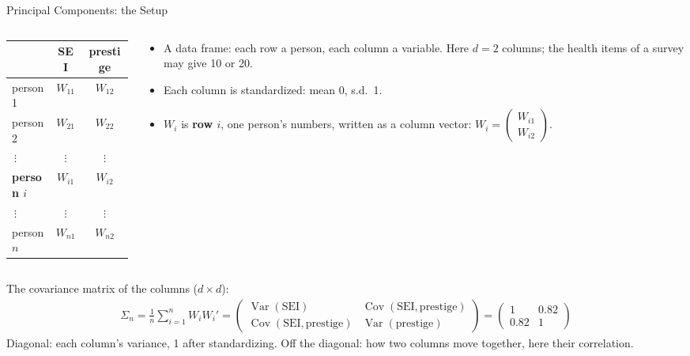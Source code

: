 \documentclass[aspectratio=169,11pt,xcolor=dvipsnames]{beamer}
\DeclareMathOperator{\Cov}{Cov}
\DeclareMathOperator{\Var}{Var}
\begin{document}
\begin{frame}{Principal Components: the Setup}
\begin{columns}[c]
\begin{column}{0.4\linewidth}
\begin{center}\small
\renewcommand{\arraystretch}{1.1}
\begin{tabular}{@{}lcc@{}}
\toprule
 & SEI & prestige \\
\midrule
person 1 & $W_{11}$ & $W_{12}$ \\
person 2 & $W_{21}$ & $W_{22}$ \\
$\ \vdots$ & $\vdots$ & $\vdots$ \\
\textcolor{accent}{\textbf{person $i$}} & \textcolor{accent}{$W_{i1}$} & \textcolor{accent}{$W_{i2}$} \\
$\ \vdots$ & $\vdots$ & $\vdots$ \\
person $n$ & $W_{n1}$ & $W_{n2}$ \\
\bottomrule
\end{tabular}
\end{center}
\end{column}
\begin{column}{0.58\linewidth}
\small
\begin{itemize}\itemsep4pt
  \item A data frame: each row a person, each column a variable. Here $d = 2$ columns; the health items of a survey may give 10 or 20.
  \item Each column is standardized: mean 0, s.d.\ 1.
  \item $W_i$ is \textbf{row $i$}, one person's numbers, written as a column vector:
        $W_i = \begin{pmatrix} W_{i1} \\ W_{i2} \end{pmatrix}$.
\end{itemize}
\end{column}
\end{columns}
\vskip2pt
The covariance matrix of the columns ($d \times d$):
{\small
\begin{align*}
  \Sigma_n = \frac1n\sum_{i=1}^n W_i W_i'
  = \begin{pmatrix} \Var(\text{SEI}) & \Cov(\text{SEI}, \text{prestige}) \\ \Cov(\text{SEI}, \text{prestige}) & \Var(\text{prestige}) \end{pmatrix}
  = \begin{pmatrix} 1 & 0.82 \\ 0.82 & 1 \end{pmatrix}
\end{align*}}
\vskip-4pt
{\small Diagonal: each column's variance, 1 after standardizing. Off the diagonal: how two columns move
together, here their correlation.}
\end{frame}
\end{document}
